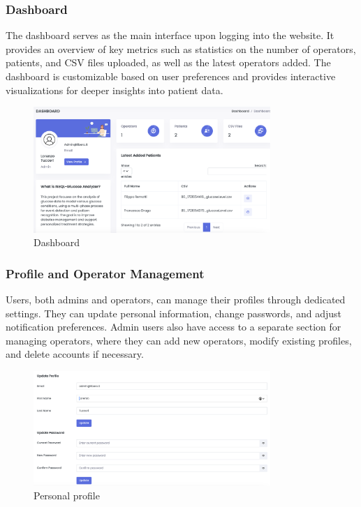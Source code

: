 \documentclass{article}
\begin{document}
\subsubsection{Dashboard}
The dashboard serves as the main interface upon logging into the website. It provides an overview of key metrics such as statistics on the number of operators, patients, and CSV files uploaded, as well as the latest operators added. The dashboard is customizable based on user preferences and provides interactive visualizations for deeper insights into patient data.

\begin{figure}[h!]
    \centering
    \includegraphics[width=0.8\textwidth]{Images/Web/dashboard.png}
    \caption{Dashboard}
    \label{fig:Dashboard}
\end{figure}

\pagebreak
\subsubsection{Profile and Operator Management}
Users, both admins and operators, can manage their profiles through dedicated settings. They can update personal information, change passwords, and adjust notification preferences. Admin users also have access to a separate section for managing operators, where they can add new operators, modify existing profiles, and delete accounts if necessary.


\begin{figure}[h!]
    \centering
    \includegraphics[width=0.8\textwidth]{Images/Web/personal_profile.png}
    \caption{Personal profile}
    \label{fig:Personal profile}
\end{figure}
\end{document}
